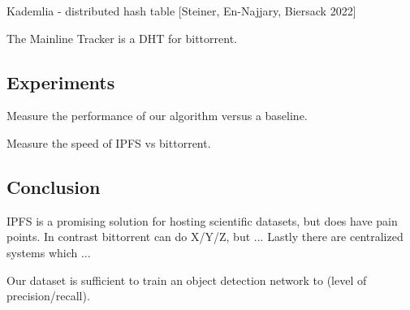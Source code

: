 \documentclass[10pt,twocolumn,letterpaper]{article}
\begin{document}
Kademlia - distributed hash table [Steiner, En-Najjary, Biersack 2022]

The Mainline Tracker is a DHT for bittorrent.



\subsection{Experiments}

Measure the performance of our algorithm versus a baseline.

Measure the speed of IPFS vs bittorrent.

\subsection{Conclusion}

IPFS is a promising solution for hosting scientific datasets, but does have pain points.
In contrast bittorrent can do X/Y/Z, but ...
Lastly there are centralized systems which ...

Our dataset is sufficient to train an object detection network to (level of
precision/recall).



{\small


}
\end{document}
